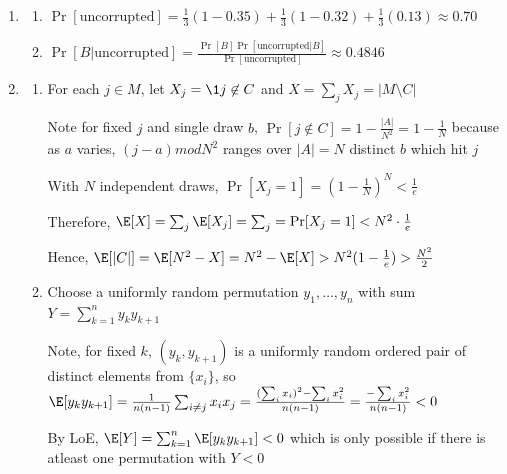 \documentclass[12pt, a4paper]{article}
\begin{document}
\begin{enumerate}[Q\arabic*.]
\begin{enumerate}
      \item $P_E(E=j) = 0.028 + 0.001 = 0.142 = 0.171$
        No; since $P_E(E=j)P_V(V=h) = 0.074556 \neq 0.027 = P_{EV}(E=j, V=h)$

      \item No, same reason as (b) 

      \item $\Pr(E=t, V\neq t) = \frac{0.254 +  0.016}{1 - 0.314} \approx 0.393$ 
    \end{enumerate}

  \item 
    \begin{enumerate}
      \item $\Pr[\text{uncorrupted}] = \frac{1}{3}(1-0.35) + \frac{1}{3}(1- 0.32) + \frac{1}{3}(0.13) \approx 0.70$

      \item $\Pr[B|\text{uncorrupted}] = \frac{\Pr[B]\Pr[\text{uncorrupted}|B]}{\Pr[\text{uncorrupted}]} \approx 0.4846$ 
    \end{enumerate}

  \pagebreak
  \item 
    \begin{enumerate}
      \item For each $j\in M$, let $X_j = \1{j\not\in C}$ and $X = \sum_j X_j = |M\setminus C|$

        Note for fixed $j$ and single draw $b$, $\Pr[j\not\in C] = 1 - \frac{|A|}{N^2} = 1- \frac{1}{N}$ because as $a$ varies, $(j-a) mod N^2$ ranges over $|A| = N$ distinct $b$ which hit $j$

        With $N$ independent draws, $\Pr[X_j = 1] = (1-\frac{1}{N})^N < \frac{1}{e}$

        Therefore, $\E[X] = \sum_j \E[X_j] = \sum_j = \Pr[X_j = 1] < N^2 \cdot \frac{1}{e}$

        Hence, $\E[|C|] = \E[N^2 - X] = N^2 - \E[X] > N^2(1-\frac{1}{e}) > \frac{N^2}{2}$

      \item Choose a uniformly random permutation $y_1,\dots, y_n$ with sum $Y = \sum^n_{k=1}y_ky_{k+1}$ 

        Note, for fixed $k$, $(y_k, y_{k+1})$ is a uniformly random ordered pair of distinct elements from $\{x_i\}$, so $\E[y_ky_{k+1}] = \frac{1}{n(n-1)}\sum_{i\neq j}x_ix_j = \frac{(\sum_ix_i)^2 - \sum_ix_i^2}{n(n-1)} = \frac{-\sum_ix_i^2}{n(n-1)} < 0$

        By LoE, $\E[Y] = \sum^n_{k=1}\E[y_ky_{k+1}] < 0$ which is only possible if there is atleast one permutation with $Y < 0$
    \end{enumerate}


\end{enumerate}
\end{document}
